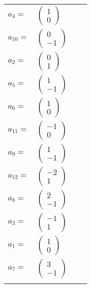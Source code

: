 \documentclass[1p]{elsarticle_modified}
\theoremstyle{definition}
\begin{document}
\begin{tabular}{m{7pt} m{180pt} m{7pt} m{180pt} }
\flushright $a_{4}=$&$\begin{pmatrix}1\\0\end{pmatrix}$ \\
\flushright $a_{10}=$&$\begin{pmatrix}0\\-1\end{pmatrix}$ \\
\flushright $a_{2}=$&$\begin{pmatrix}0\\1\end{pmatrix}$ \\
\flushright $a_{5}=$&$\begin{pmatrix}1\\-1\end{pmatrix}$ \\
\flushright $a_{6}=$&$\begin{pmatrix}1\\0\end{pmatrix}$ \\
\flushright $a_{11}=$&$\begin{pmatrix}-1\\0\end{pmatrix}$ \\
\flushright $a_{9}=$&$\begin{pmatrix}1\\-1\end{pmatrix}$ \\
\flushright $a_{12}=$&$\begin{pmatrix}-2\\1\end{pmatrix}$ \\
\flushright $a_{8}=$&$\begin{pmatrix}2\\-1\end{pmatrix}$ \\
\flushright $a_{3}=$&$\begin{pmatrix}-1\\1\end{pmatrix}$ \\
\flushright $a_{1}=$&$\begin{pmatrix}1\\0\end{pmatrix}$ \\
\flushright $a_{7}=$&$\begin{pmatrix}3\\-1\end{pmatrix}$\\&\end{tabular}
\end{document}

